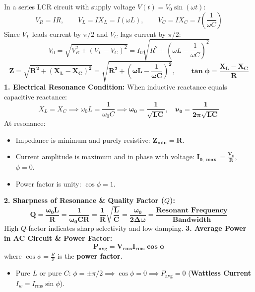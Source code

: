 \documentclass[10pt,a4paper]{article}
\begin{document}
\begin{formulabox}
In a series LCR circuit with supply voltage $V(t) = V_0 \sin(\omega t)$:
\begin{equation}
  V_R = I R, \qquad V_L = I X_L = I (\omega L), \qquad V_C = I X_C = I \left(\frac{1}{\omega C}\right)
\end{equation}
Since $V_L$ leads current by $\pi/2$ and $V_C$ lags current by $\pi/2$:
\begin{equation}
  V_0 = \sqrt{V_R^2 + (V_L - V_C)^2} = I_0 \sqrt{R^2 + \left(\omega L - \frac{1}{\omega C}\right)^2}
\end{equation}
\begin{equation}
  \mathbf{Z = \sqrt{R^2 + (X_L - X_C)^2} = \sqrt{R^2 + \left(\omega L - \frac{1}{\omega C}\right)^2}}, \qquad \mathbf{\tan\phi = \frac{X_L - X_C}{R}}
\end{equation}
\textbf{1. Electrical Resonance Condition:}
When inductive reactance equals capacitive reactance:
\begin{equation}
  X_L = X_C \implies \omega_0 L = \frac{1}{\omega_0 C} \implies \mathbf{\omega_0 = \frac{1}{\sqrt{LC}}}, \quad \mathbf{\nu_0 = \frac{1}{2\pi\sqrt{LC}}}
\end{equation}
At resonance:
\begin{itemize}
  \item Impedance is minimum and purely resistive: $\mathbf{Z_{\min} = R}$.
  \item Current amplitude is maximum and in phase with voltage: $\mathbf{I_{0,\max} = \frac{V_0}{R}}$, $\phi = 0$.
  \item Power factor is unity: $\cos\phi = 1$.
\end{itemize}
\textbf{2. Sharpness of Resonance \& Quality Factor ($Q$):}
\begin{equation}
  \mathbf{Q = \frac{\omega_0 L}{R} = \frac{1}{\omega_0 C R} = \frac{1}{R}\sqrt{\frac{L}{C}} = \frac{\omega_0}{2\Delta\omega} = \frac{\text{Resonant Frequency}}{\text{Bandwidth}}}
\end{equation}
High $Q$-factor indicates sharp selectivity and low damping.
\textbf{3. Average Power in AC Circuit \& Power Factor:}
\begin{equation}
  \mathbf{P_{\text{avg}} = V_{\text{rms}} I_{\text{rms}} \cos\phi}
\end{equation}
where $\cos\phi = \frac{R}{Z}$ is the \textbf{power factor}.
\begin{itemize}
  \item Pure $L$ or pure $C$: $\phi = \pm \pi/2 \implies \cos\phi = 0 \implies P_{\text{avg}} = 0$ (\textbf{Wattless Current} $I_w = I_{\text{rms}} \sin\phi$).

\end{itemize}
\end{formulabox}
\end{document}
